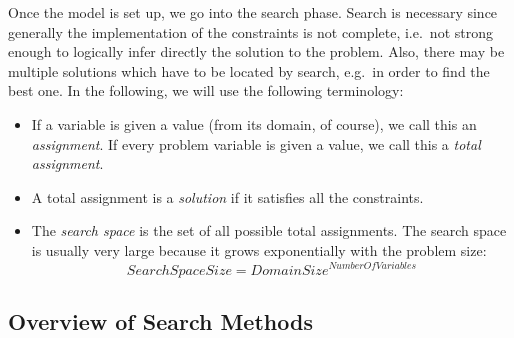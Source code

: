 Once the model is set up, we go into the search phase.
Search is necessary since generally the implementation of the constraints
is not complete, i.e.\ not strong enough to logically infer directly
the solution to the problem. Also, there may be multiple solutions
which have to be located by search, e.g.\ in order to find the best one.
In the following, we will use the following terminology:
\begin{itemize}
\item If a variable is given a value (from its domain, of course),
        we call this an {\em assignment}. If every problem variable is given
        a value, we call this a {\em total assignment}.
\item A total assignment is a {\em solution} if it satisfies all the
        constraints.
\item The {\em search space} is the set of all possible total assignments.
        The search space is usually very large because it grows exponentially
        with the problem size:
        \begin{displaymath}
        SearchSpaceSize = {DomainSize}^{NumberOfVariables}
        \end{displaymath}
\end{itemize}


\subsection{Overview of Search Methods}

